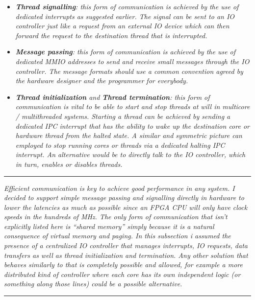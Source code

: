         \begin{itemize}

            \item \textit{\textbf{Thread signalling}: this form of communication is achieved by the use of dedicated interrupts as suggested earlier. The signal can be sent to an IO controller just like a request from an external IO device which can then forward the request to the destination thread that is interrupted.}

            \item \textit{\textbf{Message passing}: this form of communication is achieved by the use of dedicated MMIO addresses to send and receive small messages through the IO controller. The message formats should use a common convention agreed by the hardware designer and the programmer for everybody.}

            \item \textit{\textbf{Thread initialization} and \textbf{Thread termination}: this form of communication is vital to be able to start and stop threads at will in multicore / multithreaded systems. Starting a thread can be achieved by sending a dedicated IPC interrupt that has the ability to wake up the destination core or hardware thread from the halted state. A similar and symmetric picture can employed to stop running cores or threads via a dedicated halting IPC interrupt. An alternative would be to directly talk to the IO controller, which in turn, enables or disables threads.}

        \end{itemize}

    \par\noindent\rule{\textwidth}{0.4pt}
    \textit{Efficient communication is key to achieve good performance in any system. I decided to support simple message passing and signalling directly in hardware to lower the latencies as much as possible since an FPGA CPU will only have clock speeds in the hundreds of MHz. The only form of communication that isn't explicitly listed here is ``shared memory'' simply because it is a natural consequence of virtual memory and paging. In this subsection i assumed the presence of a centralized IO controller that manages interrupts, IO requests, data transfers as well as thread initialization and termination. Any other solution that behaves similarly to that is completely possible and allowed, for example a more distributed kind of controller where each core has its own independent logic (or something along those lines) could be a possible alternative.}
    \par\noindent\rule{\textwidth}{0.4pt}